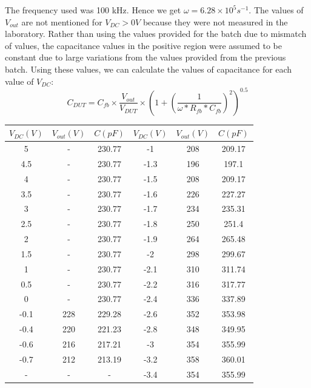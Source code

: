 \documentclass[12pt]{article}
\begin{document}
The frequency used was 100 kHz. Hence we get \(\omega = 6.28 \times 10^5 s^{-1}\). The values of \(V_{out}\) are not mentioned for \(V_{DC} > 0 V\) because they were not measured in the laboratory. Rather than using the values provided for the batch due to mismatch of values, the capacitance values in the positive region were assumed to be constant due to large variations from the values provided from the previous batch. Using these values, we can calculate the values of capacitance for each value of \( V_{DC} \):
\[C_{DUT} = C_{fb} \times \frac{V_{out}} {V_{DUT}} \times \left(1+\left(\frac{1}{\omega*R_{fb}*C_{fb}}\right)^2\right)^{0.5}\]

\begin{center}
 \begin{tabular}{|| c | c | c || c | c | c ||} 
 \hline
 \hline
 \( V_{DC} (V) \) & \( V_{out} (V) \) & \( C (pF) \) & \( V_{DC} (V) \) & \( V_{out} (V) \) & \( C (pF) \) \\ [0.25ex] 
 \hline\hline
 \hline 
5 & - & 230.77 & -1 & 208 & 209.17 \\ \hline
4.5 & - & 230.77 & -1.3 & 196 & 197.1 \\ \hline
4 & - & 230.77  & -1.5 & 208 & 209.17  \\ \hline
3.5 & - & 230.77  & -1.6 & 226 & 227.27  \\ \hline
3 & - & 230.77 & -1.7 & 234 & 235.31 \\ \hline
2.5 & - & 230.77 & -1.8 & 250 & 251.4 \\ \hline
2 & - & 230.77 & -1.9 & 264 & 265.48 \\ \hline
1.5 & - & 230.77 & -2 & 298 & 299.67  \\ \hline
1 & - & 230.77  & -2.1 & 310 & 311.74 \\ \hline
0.5 & - & 230.77 & -2.2 & 316 & 317.77 \\ \hline
0 & - & 230.77 & -2.4 & 336 & 337.89 \\ \hline
-0.1 & 228 & 229.28 & -2.6 & 352 & 353.98 \\ \hline
-0.4 & 220 & 221.23 & -2.8 & 348 & 349.95 \\ \hline
-0.6 & 216 & 217.21 & -3 & 354 & 355.99 \\ \hline
-0.7 & 212 & 213.19 & -3.2 & 358 & 360.01 \\ \hline
- & - & - & -3.4 & 354 & 355.99\\ \hline
\end{tabular}
\end{center}
\end{document}
